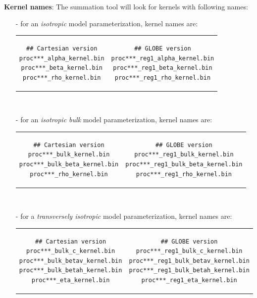 \noindent
{\bf Kernel names}: The summation tool will look for kernels with following names:
\begin{itemize}
\item [-] for an {\it isotropic} model parameterization, kernel names are:\\
\begin{tabular}{ c c }
\begin{minipage}{3in}
\begin{verbatim}
## Cartesian version
proc***_alpha_kernel.bin
proc***_beta_kernel.bin
proc***_rho_kernel.bin
\end{verbatim}
\end{minipage}
&
\begin{minipage}{3in}
\begin{verbatim}
## GLOBE version
proc***_reg1_alpha_kernel.bin
proc***_reg1_beta_kernel.bin
proc***_reg1_rho_kernel.bin
\end{verbatim}
\end{minipage}
\end{tabular}\\

\item [-] for an {\it isotropic bulk} model parameterization, kernel names are:\\
\begin{tabular}{ c c }
\begin{minipage}{3in}
\begin{verbatim}
## Cartesian version
proc***_bulk_kernel.bin
proc***_bulk_beta_kernel.bin
proc***_rho_kernel.bin
\end{verbatim}
\end{minipage}
&
\begin{minipage}{3in}
\begin{verbatim}
## GLOBE version
proc***_reg1_bulk_kernel.bin
proc***_reg1_bulk_beta_kernel.bin
proc***_reg1_rho_kernel.bin
\end{verbatim}
\end{minipage}
\end{tabular}\\

\item [-] for a {\it transversely isotropic} model parameterization, kernel names are:\\
\begin{tabular}{ c c }
\begin{minipage}{3in}
\begin{verbatim}
## Cartesian version
proc***_bulk_c_kernel.bin
proc***_bulk_betav_kernel.bin
proc***_bulk_betah_kernel.bin
proc***_eta_kernel.bin
\end{verbatim}
\end{minipage}
&
\begin{minipage}{3in}
\begin{verbatim}
## GLOBE version
proc***_reg1_bulk_c_kernel.bin
proc***_reg1_bulk_betav_kernel.bin
proc***_reg1_bulk_betah_kernel.bin
proc***_reg1_eta_kernel.bin
\end{verbatim}
\end{minipage}
\end{tabular}\\


\end{itemize}
